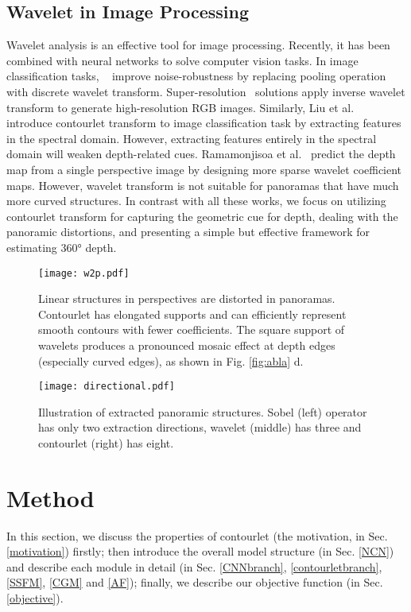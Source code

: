\documentclass[10pt,times,mathptm,psfig,twocolumn,journals]{IEEEtran}
\begin{document}
\subsection{Wavelet in Image Processing}
Wavelet analysis is an effective tool for image processing. Recently, it has been combined with neural networks to solve computer vision tasks\cite{8116695}. In image classification tasks, ~\cite{QiufuLi2020WaveletIC} improve noise-robustness by replacing pooling operation with discrete wavelet transform. Super-resolution~\cite{guo2017deep,deng2019wavelet} solutions apply inverse wavelet transform to generate high-resolution RGB images. Similarly, Liu et al.~\cite{MengkunLiu2021CCNNCC} introduce contourlet transform to image classification task by extracting features in the spectral domain. However, extracting features entirely in the spectral domain will weaken depth-related cues. Ramamonjisoa et al.~\cite{ramamonjisoa2021single} predict the depth map from a single perspective image by designing more sparse wavelet coefficient maps. However, wavelet transform is not suitable for panoramas that have much more curved structures. In contrast with all these works, we focus on utilizing contourlet transform for capturing the geometric cue for depth, dealing with the panoramic distortions, and presenting a simple but effective framework for estimating 360° depth.

\begin{figure}[t]
\texttt{[image: w2p.pdf]}
\caption{Linear structures in perspectives are distorted in panoramas. Contourlet has elongated supports and can efficiently represent smooth contours with fewer coefficients. The square support of wavelets produces a  pronounced mosaic effect at depth edges (especially curved edges), as shown in Fig. \ref{fig:abla} d.}
\label{fig:sparse}
\end{figure}
\begin{figure*}[t]
\centering
\texttt{[image: directional.pdf]}
\caption{Illustration of extracted panoramic structures. Sobel (left) operator has only two extraction directions, wavelet (middle) has three and contourlet (right) has eight.}
\label{fig:directional}
\end{figure*}
\section{Method}
\label{method}
In this section, we discuss the properties of contourlet (the motivation, in Sec. \ref{motivation}) firstly; then introduce the overall model structure (in Sec. \ref{NCN}) and describe each module in detail (in Sec. \ref{CNNbranch}, \ref{contourletbranch}, \ref{SSFM}, \ref{CGM} and \ref{AF}); finally, we describe our objective function (in Sec. \ref{objective}). 
\end{document}
